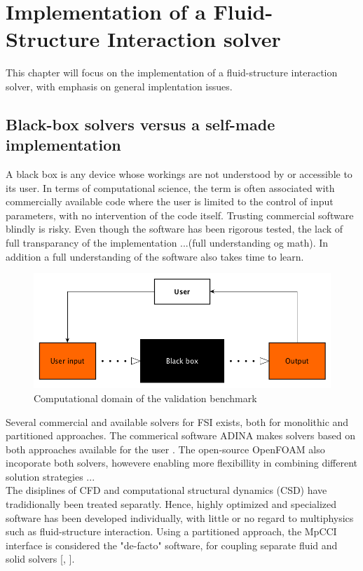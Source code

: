 \chapter{Implementation of a Fluid-Structure Interaction solver}
This chapter will focus on the implementation of a fluid-structure interaction solver, with emphasis on general implentation issues. 

\section{Black-box solvers versus a self-made implementation}
A black box is any device whose workings are not understood by or accessible to its user. In terms of computational science, the term is often associated with commercially available code where the user is limited to the control of input parameters, with no intervention of the code itself. 
Trusting commercial software blindly is risky. Even though the software has been rigorous tested, the lack of full transparancy of the implementation ...(full understanding og math). In addition a full understanding of the software also takes time to learn. \\

\begin{figure}[h!]
\hspace*{-2.2cm}
\centering    
 \includegraphics[scale=0.5]{./Fig/blackbox.png}
 \caption{Computational domain of the validation benchmark}
\end{figure}


Several commercial and  available solvers for FSI exists, both for monolithic and partitioned approaches. The commerical software ADINA makes solvers based on both approaches available for the user \cite{Zhang2003}. The open-source OpenFOAM also incoporate both solvers, howevere enabling more flexibillity in combining different solution strategies ... \\

The disiplines of CFD and computational structural dynamics (CSD) have tradidionally been treated separatly. Hence, highly optimized and specialized software has been developed individually, with little or no regard to multiphysics such as fluid-structure interaction.
Using a partitioned approach, the MpCCI interface is considered the "de-facto" software, for coupling separate fluid and solid solvers  [\cite{Wolf2007}, \cite{Geuzaine}].  \\

